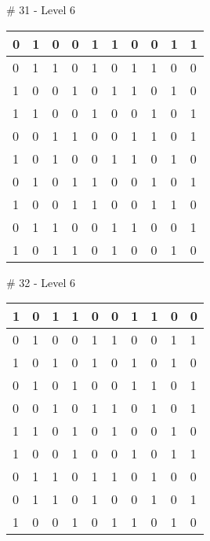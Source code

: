 \smallskip

\# 31 - Level 6 \newline
\begin{tabular}{|m{\collen}|m{\collen}|m{\collen}|m{\collen}|m{\collen}|m{\collen}|m{\collen}|m{\collen}|m{\collen}|m{\collen}|}
\hline
  0 & 1 & 0 & 0 & 1 & 1 & 0 & 0 & 1 & 1 \\
\hline
  0 & 1 & 1 & 0 & 1 & 0 & 1 & 1 & 0 & 0 \\
\hline
  1 & 0 & 0 & 1 & 0 & 1 & 1 & 0 & 1 & 0 \\
\hline
  1 & 1 & 0 & 0 & 1 & 0 & 0 & 1 & 0 & 1 \\
\hline
  0 & 0 & 1 & 1 & 0 & 0 & 1 & 1 & 0 & 1 \\
\hline
  1 & 0 & 1 & 0 & 0 & 1 & 1 & 0 & 1 & 0 \\
\hline
  0 & 1 & 0 & 1 & 1 & 0 & 0 & 1 & 0 & 1 \\
\hline
  1 & 0 & 0 & 1 & 1 & 0 & 0 & 1 & 1 & 0 \\
\hline
  0 & 1 & 1 & 0 & 0 & 1 & 1 & 0 & 0 & 1 \\
\hline
  1 & 0 & 1 & 1 & 0 & 1 & 0 & 0 & 1 & 0 \\
\hline
\end{tabular}


\smallskip

\# 32 - Level 6 \newline
\begin{tabular}{|m{\collen}|m{\collen}|m{\collen}|m{\collen}|m{\collen}|m{\collen}|m{\collen}|m{\collen}|m{\collen}|m{\collen}|}
\hline
  1 & 0 & 1 & 1 & 0 & 0 & 1 & 1 & 0 & 0 \\
\hline
  0 & 1 & 0 & 0 & 1 & 1 & 0 & 0 & 1 & 1 \\
\hline
  1 & 0 & 1 & 0 & 1 & 0 & 1 & 0 & 1 & 0 \\
\hline
  0 & 1 & 0 & 1 & 0 & 0 & 1 & 1 & 0 & 1 \\
\hline
  0 & 0 & 1 & 0 & 1 & 1 & 0 & 1 & 0 & 1 \\
\hline
  1 & 1 & 0 & 1 & 0 & 1 & 0 & 0 & 1 & 0 \\
\hline
  1 & 0 & 0 & 1 & 0 & 0 & 1 & 0 & 1 & 1 \\
\hline
  0 & 1 & 1 & 0 & 1 & 1 & 0 & 1 & 0 & 0 \\
\hline
  0 & 1 & 1 & 0 & 1 & 0 & 0 & 1 & 0 & 1 \\
\hline
  1 & 0 & 0 & 1 & 0 & 1 & 1 & 0 & 1 & 0 \\
\hline
\end{tabular}


\smallskip

